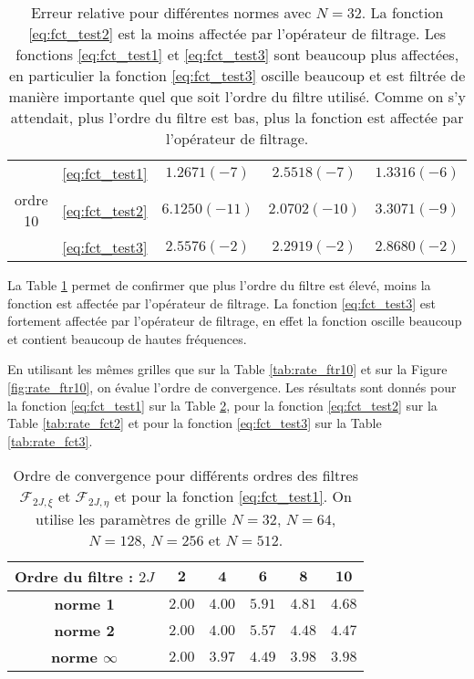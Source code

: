 \begin{table}[htbp]
\begin{center}
\begin{tabular}{|c||c||c|c|c|}
     & \eqref{eq:fct_test1} 
     & $1.2671(-7)$  & $2.5518(-7)$  & $1.3316(-6)$  \\
ordre 10	& \eqref{eq:fct_test2} & $6.1250(-11)$  & $2.0702(-10)$  & $3.3071(-9)$  \\
     & \eqref{eq:fct_test3} & $2.5576(-2)$  & $2.2919(-2)$  & $2.8680(-2)$  \\
\hline

\end{tabular}
\end{center}
\caption{Erreur relative pour différentes normes avec $N=32$. La fonction \eqref{eq:fct_test2} est la moins affectée par l'opérateur de filtrage. Les fonctions \eqref{eq:fct_test1} et \eqref{eq:fct_test3} sont beaucoup plus affectées, en particulier la fonction \eqref{eq:fct_test3} oscille beaucoup et est filtrée de manière importante quel que soit l'ordre du filtre utilisé. Comme on s'y attendait, plus l'ordre du filtre est bas, plus la fonction est affectée par l'opérateur de filtrage.}
\label{tab:diff_ftr}
\end{table} 

La Table \ref{tab:diff_ftr} permet de confirmer que plus l'ordre du filtre est élevé, moins la fonction est affectée par l'opérateur de filtrage. La fonction \eqref{eq:fct_test3} est fortement affectée par l'opérateur de filtrage, en effet la fonction oscille beaucoup et contient beaucoup de hautes fréquences.

En utilisant les mêmes grilles que sur la Table \ref{tab:rate_ftr10} et sur la Figure \ref{fig:rate_ftr10}, on évalue l'ordre de convergence. Les résultats sont donnés pour la fonction \eqref{eq:fct_test1} sur la Table \ref{tab:rate_fct1}, pour la fonction \eqref{eq:fct_test2} sur la Table \ref{tab:rate_fct2} et pour la fonction \eqref{eq:fct_test3} sur la Table \ref{tab:rate_fct3}.

\begin{table}[htbp]
\begin{center}
\begin{tabular}{|c||c|c|c|c|c|}
\hline
\textbf{Ordre du filtre :} $2J$ & $\mathbf{2}$ & $\mathbf{4}$ & $\mathbf{6}$ & $\mathbf{8}$ & $\mathbf{10}$ \\
\hline
\hline
\textbf{norme 1} & $2.00$ & $4.00$ & $5.91$ & $4.81$ & $4.68$\\
\textbf{norme 2} & $2.00$ & $4.00$ & $5.57$ & $4.48$ & $4.47$\\
\textbf{norme $\infty$} & $2.00$ & $3.97$ & $4.49$ & $3.98$ & $3.98$\\
\hline
\end{tabular}
\end{center}
\caption{Ordre de convergence pour différents ordres des filtres $\mathcal{F}_{2J,\xi}$ et $\mathcal{F}_{2J,\eta}$ et pour la fonction \eqref{eq:fct_test1}. On utilise les paramètres de grille $N=32$, $N=64$, $N=128$, $N=256$ et $N=512$.}
\label{tab:rate_fct1}
\end{table} 

